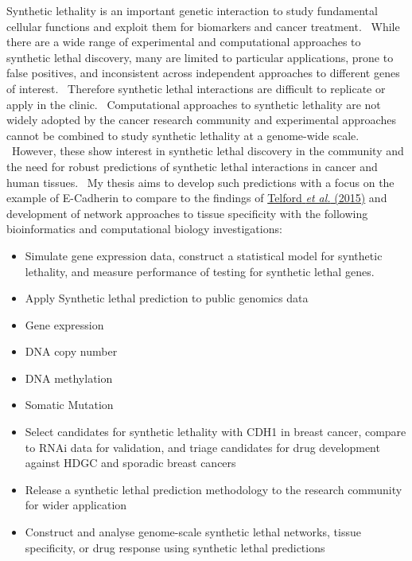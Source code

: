 Synthetic lethality is an important genetic interaction to study fundamental cellular functions and exploit them for biomarkers and cancer treatment. \ While there are a wide range of experimental and computational approaches to synthetic lethal discovery, many are limited to particular applications, prone to false positives, and inconsistent across independent approaches to different genes of interest. \ Therefore synthetic lethal interactions are difficult to replicate or apply in the clinic. \ Computational approaches to synthetic lethality are not widely adopted by the cancer research community and experimental approaches cannot be combined to study synthetic lethality at a genome-wide scale. \ However, these show interest in synthetic lethal discovery in the community and the need for robust predictions of synthetic lethal interactions in cancer and human tissues. \ My thesis aims to develop such predictions with a focus on the example of E-Cadherin to compare to the findings of \hyperlink{ENREF94}{Telford}\hyperlink{ENREF94}{\textit{ et al.}}\hyperlink{ENREF94}{ (2015)} and development of network approaches to tissue specificity with the following bioinformatics and computational biology investigations:

\begin{itemize}

\item 

Simulate gene expression data, construct a statistical model for
synthetic lethality, and measure performance of testing for synthetic
lethal genes. \ 

\item 

Apply Synthetic lethal prediction to public genomics data



\item 

Gene expression

\item 

DNA copy number

\item 

DNA methylation

\item 

Somatic Mutation

\item 

Select candidates for synthetic lethality with CDH1 in breast cancer,
compare to RNAi data for validation, and triage candidates for drug
development against HDGC and sporadic breast cancers

\item 

Release a synthetic lethal prediction methodology to the research
community for wider application 

\item 

Construct and analyse genome-scale synthetic lethal networks, tissue
specificity, or drug response using synthetic lethal predictions

\end{itemize}
